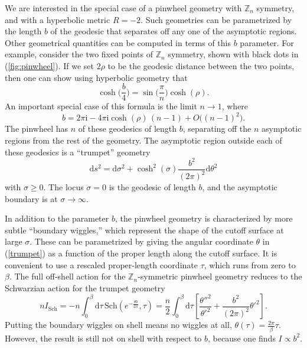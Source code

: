 \documentclass[11pt]{article}
\newcommand{\be}{\begin{equation}}
\newcommand{\ee}{\end{equation}}
\numberwithin{equation}{section}
\begin{document}

We are interested in the special case of a pinwheel geometry with $\mathbb{Z}_n$ symmetry, and with a hyperbolic metric $R = -2$. Such geometries can be parametrized by the length $b$ of the geodesic that separates off any one of the asymptotic regions. Other geometrical quantities can be computed in terms of this $b$ parameter. For example, consider the two fixed points of $\mathbb{Z}_n$ symmetry, shown with black dots in (\ref{fig:pinwheel}). If we set $2\rho$ to be the geodesic distance between the two points, then one can show using hyperbolic geometry that
\be
\cosh\Big(\frac{b}{4}\Big) = \sin\Big(\frac{\pi}{n}\Big)\cosh(\rho).
\ee
An important special case of this formula is the limit $n\rightarrow 1$, where
\be
b = 2\pi \mathrm{i} - 4\pi \mathrm{i} \cosh(\rho)\, (n{-}1) + O\big((n{-}1)^2\big).\label{nnearone}
\ee
The pinwheel has $n$ of these geodesics of length $b$, separating off the $n$ asymptotic regions from the rest of the geometry. The asymptotic region outside each of these geodesics is a ``trumpet'' geometry
\be
\mathrm{d}s^2 = \mathrm{d}\sigma^2 + \cosh^2(\sigma) \frac{b^2}{(2\pi)^2}\mathrm{d}\theta^2\label{trumpet}
\ee
with $\sigma \ge 0$. The locus $\sigma = 0$ is the geodesic of length $b$, and the asymptotic boundary is at $\sigma \rightarrow \infty$. 

In addition to the parameter $b$, the pinwheel geometry is characterized by more subtle ``boundary wiggles,'' which represent the shape of the cutoff surface at large $\sigma$. These can be parametrized by giving the angular coordinate $\theta$ in (\ref{trumpet}) as a function of the proper length along the cutoff surface. It is convenient to use a rescaled proper-length coordinate $\tau$, which runs from zero to $\beta$. The full off-shell action for the $\mathbb{Z}_n$-symmetric pinwheel geometry reduces \cite{Maldacena:2019cbz} to the Schwarzian action for the trumpet geometry \cite{Saad:2019lba}
\be
nI_{\text{Sch}} = -n\int_0^\beta\mathrm{d}\tau\, \text{Sch}(e^{-\frac{\theta b}{2\pi}},\tau) = \frac{n}{2}\int_0^\beta\mathrm{d}\tau\left[\frac{\theta''^2}{\theta'^2} + \frac{b^2}{(2\pi)^2}\theta'^2\right].
\ee
Putting the boundary wiggles on shell means no wiggles at all, $\theta(\tau) = \frac{2\pi}{\beta}\tau$. However, the result is still not on shell with respect to $b$, because one finds $I \propto b^2$.
\end{document}
